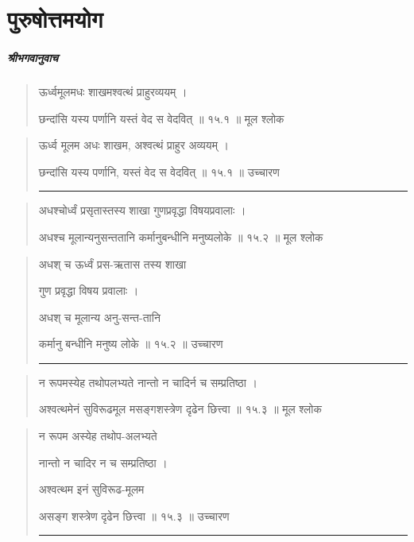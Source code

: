 \chapter{\sanskrit पुरुषोत्तमयोग} 
\paragraph{\sanskrit श्रीभगवानुवाच}
\begin{quotation} 
ऊर्ध्वमूलमधः शाखमश्वत्थं प्राहुरव्ययम्‌  ।  

छन्दांसि यस्य पर्णानि यस्तं वेद स वेदवित्‌  ॥ १५.१ ॥  मूल श्लोक
\end{quotation}

\begin{quotation}

ऊर्ध्व मूलम अधः शाखम, अश्वत्थं प्राहुर अव्ययम्‌  ।  

छन्दांसि यस्य पर्णानि, यस्तं वेद स वेदवित्‌  ॥ १५.१ ॥  उच्चारण

\noindent\rule{16cm}{0.4pt} 
\end{quotation}


\begin{quotation}

अधश्चोर्ध्वं प्रसृतास्तस्य शाखा गुणप्रवृद्धा विषयप्रवालाः  ।  

अधश्च मूलान्यनुसन्ततानि कर्मानुबन्धीनि मनुष्यलोके  ॥ १५.२ ॥  मूल श्लोक
\end{quotation}

\begin{quotation}

अधश् च ऊर्ध्वं प्रस-ऋतास तस्य शाखा 

गुण प्रवृद्धा विषय प्रवालाः  ।  

अधश् च मूलान्य अनु-सन्त-तानि 

कर्मानु बन्धीनि मनुष्य लोके  ॥ १५.२ ॥  उच्चारण

\noindent\rule{16cm}{0.4pt} 
\end{quotation}


\begin{quotation}

न रूपमस्येह तथोपलभ्यते नान्तो न चादिर्न च सम्प्रतिष्ठा  ।  

अश्वत्थमेनं सुविरूढमूल मसङ्‍गशस्त्रेण दृढेन छित्त्वा  ॥ १५.३ ॥  मूल श्लोक
\end{quotation}

\begin{quotation}

न रूपम अस्येह तथोप-अलभ्यते 

नान्तो न चादिर न च सम्प्रतिष्ठा  ।  

अश्वत्थम इनं सुविरूढ-मूलम

असङ्‍ग शस्त्रेण दृढेन छित्त्वा  ॥ १५.३ ॥  उच्चारण

\noindent\rule{16cm}{0.4pt} 
\end{quotation}


